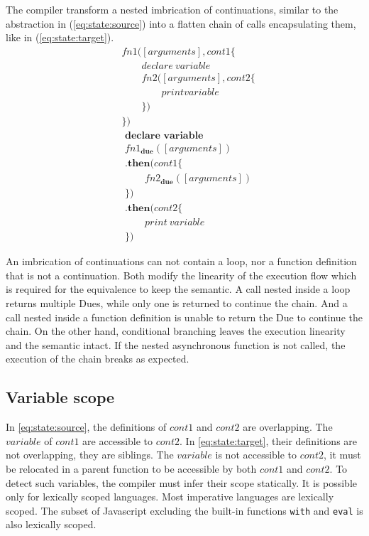 The compiler transform a nested imbrication of continuations, similar to the abstraction in (\ref{eq:state:source}) into a flatten chain of calls encapsulating them, like in (\ref{eq:state:target}).
\begin{align} \label{eq:state:source}
&fn1([arguments], cont1 \{\nonumber\\
&\qquad  declare ~ variable\nonumber\\
&\qquad  fn2([arguments], cont2 \{\nonumber\\
&\qquad\qquad    print variable\nonumber\\
&\qquad  \})\nonumber\\
&\})
\end{align}
\begin{align} \label{eq:state:target}
&\textbf{declare variable}\nonumber\\
&fn1_\textbf{due}([arguments])\nonumber\\
&\textbf{.then}(cont1\{\nonumber\\
&\qquad  fn2_\textbf{due}([arguments])\nonumber\\
&\})\nonumber\\
&\textbf{.then}(cont2\{\nonumber\\
&\qquad  print ~ variable\nonumber\\
&\})
\end{align}

An imbrication of continuations can not contain a loop, nor a function definition that is not a continuation.
Both modify the linearity of the execution flow which is required for the equivalence to keep the semantic.
A call nested inside a loop returns multiple Dues, while only one is returned to continue the chain.
And a call nested inside a function definition is unable to return the Due to continue the chain.
On the other hand, conditional branching leaves the execution linearity and the semantic intact.
If the nested asynchronous function is not called, the execution of the chain breaks as expected.

\subsection{Variable scope}

In \ref{eq:state:source}, the definitions of $cont1$ and $cont2$ are overlapping.
The $variable$ of $cont1$ are accessible to $cont2$.
In \ref{eq:state:target}, their definitions are not overlapping, they are siblings.
The $variable$ is not accessible to $cont2$, it must be relocated in a parent function to be accessible by both $cont1$ and $cont2$.
To detect such variables, the compiler must infer their scope statically.
It is possible only for lexically scoped languages.
Most imperative languages are lexically scoped.
The subset of Javascript excluding the built-in functions \texttt{with} and \texttt{eval} is also lexically scoped.